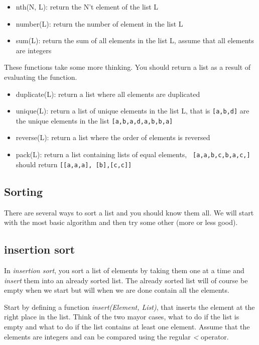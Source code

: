 \documentclass[a4paper,11pt]{article}
\begin{document}
\begin{itemize}
\item nth(N, L): return the N't element of the list L
\item number(L): return the number of element in the list L
\item sum(L): return the sum of all elements in the list L, assume
  that all elements are integers
\end{itemize}


These functions take some more thinking. You should return a list as a
result of evaluating the function.

\begin{itemize}
\item duplicate(L): return a list where all elements are duplicated
\item unique(L): return a list of unique elements in the list L, that is {\tt [a,b,d]} are the unique elements in the list {\tt [a,b,a,d,a,b,b,a]}
\item reverse(L): return a list where the order of elements is reversed
\item pack(L): return a list containing lists of equal elements, {\tt
  [a,a,b,c,b,a,c,]} should return {\tt [[a,a,a], [b],[c,c]]}
\end{itemize}



\subsection{Sorting}

There are several ways to sort a list and you should know them all. We
will start with the most basic algorithm and then try some other (more or less good).

\subsection{insertion sort}

In {\em insertion sort}, you sort a list of elements by taking them
one at a time and {\em insert} them into an already sorted list. The
already sorted list will of course be empty when we start but will
when we are done contain all the elements.

Start by defining a function {\em insert(Element, List)}, that inserts
the element at the right place in the list. Think of the two mayor
cases, what to do if the list is empty and what to do if the list
contains at least one element. Assume that the elements are integers
and can be compared using the regular {\em <} operator.
\end{document}

